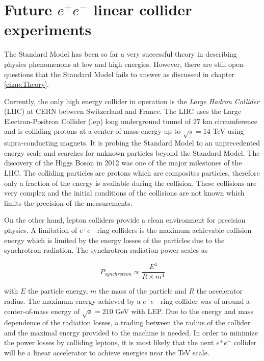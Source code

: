 \chapter{Future $e^+e^-$ linear collider experiments}
\label{chap:FutureColliders}

The Standard Model has been so far a very successful theory in describing physics phenomenons at low and high energies. However, there are still open-questions that the Standard Model fails to answer as discussed in chapter \ref{chap:Theory}.

Currently, the only high energy collider in operation is the \textit{Large Hadron Collider} (LHC) at CERN between Switzerland and France. The LHC uses the Large Electron-Positron Collider (\acrshort{lep}) long underground tunnel of 27 km circumference and is colliding protons at a center-of-mass energy up to $\sqrt{s} = 14$ TeV using supra-conducting magnets. It is probing the Standard Model to an unprecedented energy scale and searches for unknown particles beyond the Standard Model. The discovery of the Higgs Boson in 2012 was one of the major milestones of the LHC. The colliding particles are protons which are composites particles, therefore only a fraction of the energy is available during the collision. These collisions are very complex and the initial conditions of the collisions are not known which limits the precision of the measurements.

On the other hand, lepton colliders provide a clean environment for precision physics. A limitation of $e^+e^-$ ring colliders is the maximum achievable collision energy which is limited by the energy losses of the particles due to the synchrotron radiation. The synchrotron radiation power scales as

\begin{equation}
  P_{synchrotron} \propto \frac{E^4}{R \times m^4}
\end{equation}

with $E$ the particle energy, $m$ the mass of the particle and $R$ the accelerator radius. The maximum energy achieved by a $e^+e^-$ ring collider was of around a center-of-mass energy of $\sqrt{s} = 210$ GeV with LEP. Due to the energy and mass dependence of the radiation losses, a trading between the radius of the collider and the maximal energy provided to the machine is needed. In order to minimize the power losses by colliding leptons, it is most likely that the next $e^+e^-$ collider will be a linear accelerator to achieve energies near the TeV scale.

